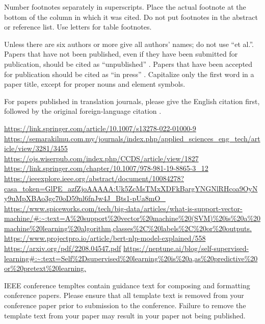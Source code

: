 \documentclass[conference]{IEEEtran}
\begin{document}
Number footnotes separately in superscripts. Place the actual footnote at 
the bottom of the column in which it was cited. Do not put footnotes in the 
abstract or reference list. Use letters for table footnotes.

Unless there are six authors or more give all authors' names; do not use 
``et al.''. Papers that have not been published, even if they have been 
submitted for publication, should be cited as ``unpublished'' \cite{b4}. Papers 
that have been accepted for publication should be cited as ``in press'' \cite{b5}. 
Capitalize only the first word in a paper title, except for proper nouns and 
element symbols.

For papers published in translation journals, please give the English 
citation first, followed by the original foreign-language citation \cite{b6}.

\begin{thebibliography}{00}
 \url{https://link.springer.com/article/10.1007/s13278-022-01000-9}
 \url{https://semarakilmu.com.my/journals/index.php/applied_sciences_eng_tech/article/view/3281/3455}
 \url{https://ojs.wiserpub.com/index.php/CCDS/article/view/1827}
 \url{https://link.springer.com/chapter/10.1007/978-981-19-8865-3_12}
 \url{https://ieeexplore.ieee.org/abstract/document/10084278?casa_token=GlPE_azfZjoAAAAA:Uk5ZcMsTMxXDFkBargYNGNlRHcoa9OyNy9uMpXBAo3gc70oD59nl6fnJw4J_Bts1-pUa8mO_}
 \url{https://www.spiceworks.com/tech/big-data/articles/what-is-support-vector-machine/#:~:text=A%20support%20vector%20machine%20(SVM)%20is%20a%20machine%20learning%20algorithm,classes%2C%20labels%2C%20or%20outputs.}
 \url{https://www.projectpro.io/article/bert-nlp-model-explained/558}
 \url{https://arxiv.org/pdf/2208.04547.pdf}
 \url{https://neptune.ai/blog/self-supervised-learning#:~:text=Self%2Dsupervised%20learning%20is%20a,as%20predictive%20or%20pretext%20learning.}
\end{thebibliography}
\vspace{12pt}
\color{red}
IEEE conference templtes contain guidance text for composing and formatting conference papers. Please ensure that all template text is removed from your conference paper prior to submission to the conference. Failure to remove the template text from your paper may result in your paper not being published.
\end{document}
